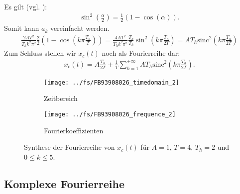\documentclass[11pt,a4paper,DIV=12]{scrartcl}
\newcommand{\sinc}{\mathrm{sinc}}
\begin{document}
%
%
%
Es gilt (vgl. \cite[Kap. 2, S. 82]{Bronstein2015}):
%
\begin{gather}
	\sin^2\left(\frac{\alpha}{2}\right)=\frac{1}{2}(1-\cos(\alpha)).
\end{gather}
%
Somit kann $a_k$ vereinfacht werden.
\begin{gather}
	\frac{2AT^2}{T_hk^2\pi^2}\frac{2}{2}\left (1-\cos\left(k\pi\frac{T_h}{T}\right)\right )
	=\frac{4AT^2}{T_hk^2\pi^2}\frac{T_h}{T_h}\sin^2\left(k\pi\frac{T_h}{2T}\right)
	=AT_h\sinc^2\left(k\pi\frac{T_h}{2T}\right)
\end{gather}
%
Zum Schluss stellen wir $x_{c}(t)$ noch als Fourierreihe dar:
%
\begin{align}
	x_{c}(t)
	=A\frac{T_h}{2T}+\frac{1}{T}\sum_{k=1}^{+\infty}AT_h\sinc^2\left(k\pi\frac{T_h}{2T}\right).
\end{align}
%
\begin{figure}
	\centering
	\begin{subfigure}{\textwidth}
		\texttt{[image: ../fs/FB93908026\_timedomain\_2]}
		\caption{Zeitbereich}
	\end{subfigure}
	\begin{subfigure}{\textwidth}
		\texttt{[image: ../fs/FB93908026\_frequence\_2]}
		\caption{Fourierkoeffizienten}
	\end{subfigure}
	\caption{Synthese der Fourierreihe von $x_c(t)$ für $A=1$, $T=4$, $T_h=2$ und
		$0\leq k\leq5$.}
\end{figure}
\newpage
\subsection*{Komplexe Fourierreihe}
\end{document}
